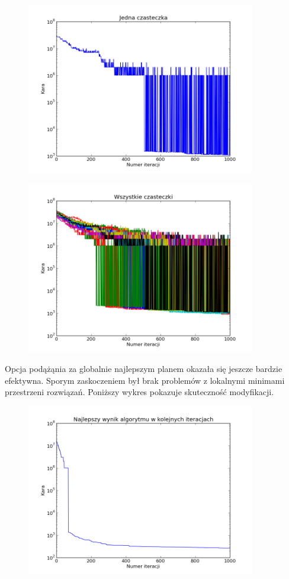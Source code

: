 \begin{figure}[H]
\includegraphics[width=10cm]{img/localbest_particle.png}
\centering
\end{figure}
\begin{figure}[H]
\includegraphics[width=10cm]{img/localbest_particle_all.png}
\centering
\end{figure}
\par Opcja podążąnia za globalnie najlepszym planem okazała się jeszcze bardzie efektywna. Sporym zaskoczeniem był brak problemów z lokalnymi minimami przestrzeni rozwiązań. Poniższy wykres pokazuje skuteczność modyfikacji.
\begin{figure}[H]
\includegraphics[width=10cm]{img/globalbest_penalty.png}
\centering
\end{figure}

